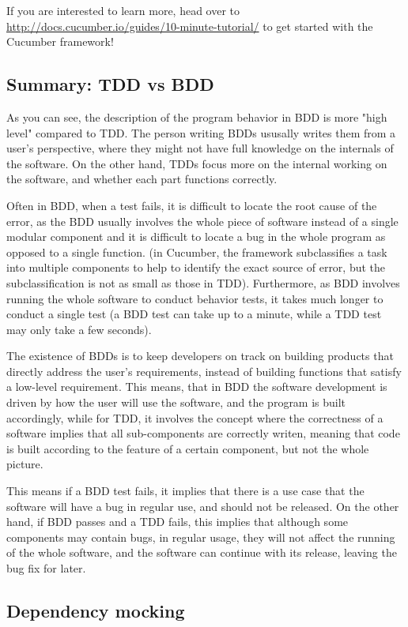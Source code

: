 If you are interested to learn more, head over to \url{http://docs.cucumber.io/guides/10-minute-tutorial/} to get started with the Cucumber framework!

\subsection{Summary: TDD vs BDD}

As you can see, the description of the program behavior in BDD is more "high level" compared to TDD. The person writing BDDs ususally writes them from a user's perspective, where they might not have full knowledge on the internals of the software. On the other hand, TDDs focus more on the internal working on the software, and whether each part functions correctly. 

Often in BDD, when a test fails, it is difficult to locate the root cause of the error, as the BDD usually involves the whole piece of software instead of a single modular component and it is difficult to locate a bug in the whole program as opposed to a single function. (in Cucumber, the framework subclassifies a task into multiple components to help to identify the exact source of error, but the subclassification is not as small as those in TDD). Furthermore, as BDD involves running the whole software to conduct behavior tests, it takes much longer to conduct a single test (a BDD test can take up to a minute, while a TDD test may only take a few seconds). 

The existence of BDDs is to keep developers on track on building products that directly address the user's requirements, instead of building functions that satisfy a low-level requirement. This means, that in BDD the software development is driven by how the user will use the software, and the program is built accordingly, while for TDD, it involves the concept where the correctness of a software implies that all sub-components are correctly writen, meaning that code is built according to the feature of a certain component, but not the whole picture. 

This means if a BDD test fails, it implies that there is a use case that the software will have a bug in regular use, and should not be released. On the other hand, if BDD passes and a TDD fails, this implies that although some components may contain bugs, in regular usage, they will not affect the running of the whole software, and the software can continue with its release, leaving the bug fix for later. 

\subsection{Dependency mocking}

